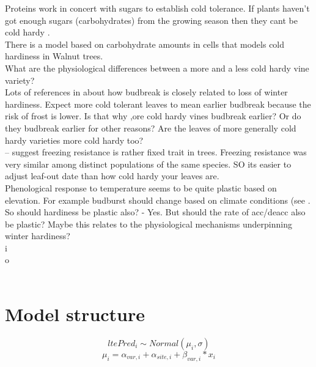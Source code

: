 \documentclass[11pt,letter]{article}
\begin{document}
Proteins work in concert with sugars to establish cold tolerance. If plants haven't got enough sugars (carbohydrates) from the growing season then they cant be cold hardy \citep{Gusta2013}. \\

There is a model based on carbohydrate amounts in cells that models cold hardiness in Walnut trees. \\ 

What are the physiological differences between a more and a less cold hardy vine variety? \\

Lots of references in \cite{Lenz2016} about how budbreak is closely related to loss of winter hardiness. Expect more cold tolerant leaves to mean earlier budbreak because the risk of frost is lower. Is that why ,ore cold hardy vines budbreak earlier? Or do they budbreak earlier for other reasons? Are the leaves of more generally cold hardy varieties more cold hardy too? \\
  
\cite{Lenz2016} – suggest freezing resistance is rather fixed trait in trees. Freezing resistance was very similar among distinct populations of the same species. SO its easier to adjust leaf-out date than how cold hardy your leaves are. \\

Phenological response to temperature seems to be quite plastic based on elevation. For example budburst should change based on climate conditions (see \citep{Caffarra2010}. So should hardiness be plastic also? - Yes. But should the rate of acc/deacc also be plastic? Maybe this relates to the physiological mechanisms underpinning winter hardiness? \\

i\\
o\\
\\

\section{Model structure}

\begin{equation*}
ltePred_{i} \sim Normal(\mu_{i}, \sigma ) 
\end{equation*}
\begin{equation*}
\mu_{i} = \alpha_{var,i} + \alpha_{site, i}+ \beta_{var, i}\ast x_{i}
\end{equation*}
\end{document}
